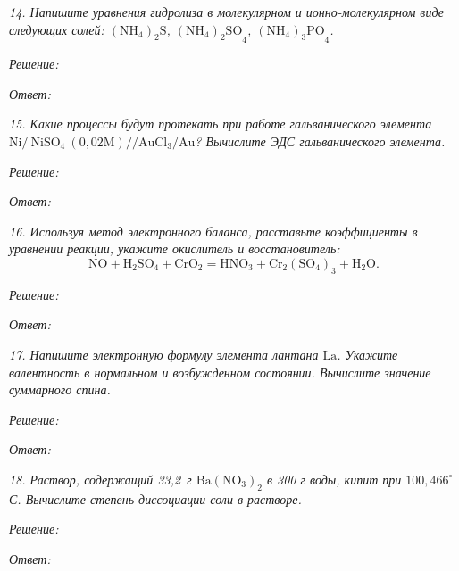 \newpage %

\emph{14. Напишите уравнения гидролиза в молекулярном и ионно-молекулярном виде
следующих солей: \( \mathrm{(NH_4)_2S} \), \( \mathrm{(NH_4)_2SO}_4 \),
\( \mathrm{(NH_4)_3PO}_4 \).}

\vspace*{2em}
\emph{Решение:}

\vspace*{2em}
\emph{Ответ: }

\newpage %

\emph{15. Какие процессы будут протекать при работе гальванического элемента
\( \mathrm{Ni/\ NiSO_4\ (0,02 M)//AuCl_3/Au} \)? Вычислите ЭДС гальванического
элемента.}

\vspace*{2em}
\emph{Решение:}

\vspace*{2em}
\emph{Ответ: }

\newpage %

\emph{16. Используя метод электронного баланса, расставьте коэффициенты в
уравнении реакции, укажите окислитель и восстановитель:}
\[
    \mathrm{NO + H_2SO_4  + CrO_2 = HNO_3 + Cr_2(SO_4)_3 + H_2O}.
\]

\vspace*{2em}
\emph{Решение:}

\vspace*{2em}
\emph{Ответ: }

\newpage %

\emph{17. Напишите электронную формулу элемента лантана \( \mathrm{La} \). Укажите
валентность в нормальном и возбужденном состоянии. Вычислите значение
суммарного спина.}

\vspace*{2em}
\emph{Решение:}

\vspace*{2em}
\emph{Ответ: }

\newpage %

\emph{18. Раствор, содержащий 33,2~г \( \mathrm{Ba(NO_3)_2} \) в 300 г воды,
кипит при \( 100,466^\circ \)С. Вычислите степень диссоциации соли в растворе.}

\vspace*{2em}
\emph{Решение:}

\vspace*{2em}
\emph{Ответ: }


